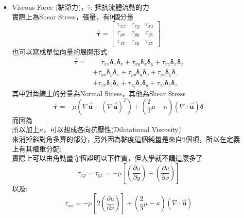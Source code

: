 \documentclass[../main.tex]{subfiles}
\begin{document}
\begin{itemize}
\begin{itemize}
    \item Viscous Force (黏滯力)，$\overline {\overline \tau}$: 抵抗流體流動的力\\
    實際上為Shear Stress，張量，有9個分量
    \begin{equation}
      \overline{\overline{\bm \tau}} = \begin{bmatrix}
        \tau_{xx} & \tau_{xy} & \tau_{xz} \\
        \tau_{yx} & \tau_{yy} & \tau_{yz} \\
        \tau_{zx} & \tau_{zy} & \tau_{zz}
      \end{bmatrix} \label{eq:shear_stress_tensor}
    \end{equation}
    也可以寫成單位向量的展開形式:
    \begin{align}
      \overline{\overline{\bm  \tau}} =& \phantom{+}\tau_{xx}\bm \delta_x\bm \delta_x + \tau_{xy}\bm \delta_x\bm \delta_y + \tau_{xz}\bm \delta_x\bm \delta_z \nonumber \\
      &+ \tau_{yx}\bm \delta_y\bm \delta_x + \tau_{yy}\bm \delta_y\bm \delta_y + \tau_{yz}\bm \delta_y\bm \delta_z \nonumber \\
      &+ \tau_{zx}\bm \delta_z\bm \delta_x + \tau_{zy}\bm \delta_z\bm \delta_y + \tau_{zz}\bm \delta_z\bm \delta_z
    \end{align}
    其中對角線上的分量為Normal Stress，其他為Shear Stress
    \begin{equation}
      \overline{\overline{\bm \tau}} = -\mu\left(
        \nabla \vec {\bm u} + (\nabla \vec {\bm u})^T
      \right) + \left(
        \frac{2}{3}\mu - \kappa
      \right)\left(\nabla \cdot \vec {\bm u}\right) \bm\delta
    \end{equation}
    而因為\\
    所以加上$\kappa$，可以想成各向抗壓性(Dilatational Viscosity)\\
    來消掉斜對角多算的部分，另外因為黏度這個純量是來自9個項，所以在定義上有其權重分配:\\
    實際上可以由角動量守恆證明以下性質，但大學就不講這麼多了
    \begin{equation}
      \tau_{xy} = \tau_{yx} = -\mu \left[
        \left(\frac{\partial u}{\partial y}\right) + \left(\frac{\partial v}{\partial x}\right)
      \right]
    \end{equation}
    以及:
    \begin{equation}
      \tau_{xx} = -\mu \left[
        2\left(\frac{\partial u}{\partial x}\right)
      \right] + \left(\frac{2}{3}\mu - \kappa\right)\left(\nabla \cdot \vec {\bm u}\right)

\end{equation}
\end{itemize}
\end{itemize}
\end{document}
